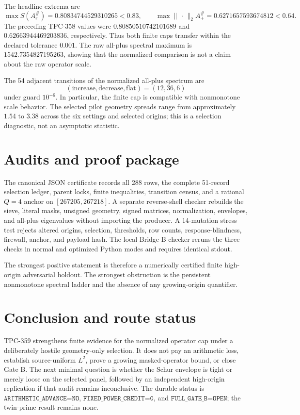 \documentclass[10pt]{article}
\newcommand{\opnorm}{\lVert\,\cdot\,\rVert_2}
\begin{document}
The headline extrema are
\begin{equation}
 \max S(A_\varepsilon^\#)=0.80834744529310265<0.83,
 \qquad
 \max\opnorm{A_{+}^\#}=0.6271657593674812<0.64.
 \label{eq:headline}
\end{equation}
The preceding TPC-358 values were $0.80850510742101689$ and
$0.62663944469203836$, respectively.  Thus both finite caps transfer within
the declared tolerance $0.001$.  The raw all-plus spectral maximum is
$1542.7354827195263$, showing that the normalized comparison is not a claim
about the raw operator scale.

The 54 adjacent transitions of the normalized all-plus spectrum are
\[
 (\text{increase},\text{decrease},\text{flat})=(12,36,6)
\]
under guard $10^{-6}$.  In particular, the finite cap is compatible with
nonmonotone scale behavior.  The selected pilot geometry spreads range from
approximately $1.54$ to $3.38$ across the six settings and selected origins;
this is a selection diagnostic, not an asymptotic statistic.

\section{Audits and proof package}

The canonical JSON certificate records all 288 rows, the complete 51-record
selection ledger, parent locks, finite inequalities, transition census, and a
rational $Q=4$ anchor on $[267205,267218]$.  A separate reverse-shell checker
rebuilds the sieve, literal masks, unsigned geometry, signed matrices,
normalization, envelopes, and all-plus eigenvalues without importing the
producer.  A 14-mutation stress test rejects altered origins, selection,
thresholds, row counts, response-blindness, firewall, anchor, and payload
hash.  The local Bridge-B checker reruns the three checks in normal and
optimized Python modes and requires identical stdout.

The strongest positive statement is therefore a numerically certified finite
high-origin adversarial holdout.  The strongest obstruction is the persistent
nonmonotone spectral ladder and the absence of any growing-origin quantifier.

\section{Conclusion and route status}

TPC-359 strengthens finite evidence for the normalized operator cap under a
deliberately hostile geometry-only selection.  It does not pay an arithmetic
loss, establish source-uniform $L^2$, prove a growing masked-operator bound,
or close Gate B.  The next minimal question is whether the Schur envelope is
tight or merely loose on the selected panel, followed by an independent
high-origin replication if that audit remains inconclusive.  The durable
status is $\texttt{ARITHMETIC\_ADVANCE=NO}$,
$\texttt{FIXED\_POWER\_CREDIT=0}$, and
$\texttt{FULL\_GATE\_B=OPEN}$; the twin-prime result remains none.
\end{document}
